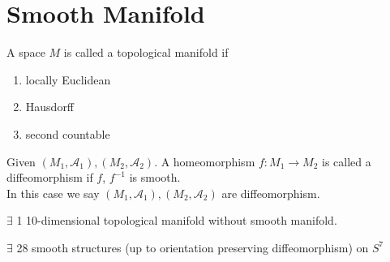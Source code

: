 
\section{Smooth Manifold}
\begin{definition}
    A space  $ M  $ is called a topological manifold if 
    \begin{enumerate}
        \item locally Euclidean
        \item Hausdorff
        \item second countable
    \end{enumerate}
\end{definition}
\begin{definition}
    Given  $ (M_1,\mathcal{A}_1),(M_2,\mathcal{A}_2) $. A homeomorphism  $ f:M_1\rightarrow M_2 $ is called a diffeomorphism if   $ f $, $ f^{-1} $  is smooth. \\
    In this case we say  $ (M_1,\mathcal{A}_1),(M_2,\mathcal{A}_2) $ are diffeomorphism. 
\end{definition}
\begin{theorem}[Kervaire]
     $ \exists  $ 1 10-dimensional topological manifold without smooth manifold.
\end{theorem}
\begin{theorem}
     $ \exists  $ 28 smooth structures (up to orientation preserving diffeomorphism) on  $ S^7 $ 
\end{theorem}

